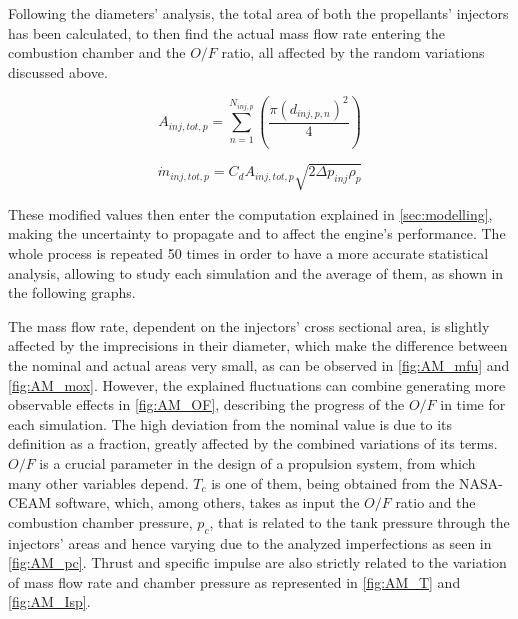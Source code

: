 Following the diameters' analysis, the total area of both the propellants' injectors has been calculated, to then find the actual mass flow rate entering the combustion chamber and the $O/F$ ratio, all affected by the random variations discussed above. 


\begin{equation}
	A_{inj,tot,p} = \sum_{n=1}^{N_{inj,p}} \left(\frac{\pi(d_{inj,p,n})^2}{4} \right)
    \label{eq:totalarea}
\end{equation}

\begin{equation}
    \dot m_{inj,tot,p} = C_{d}A_{inj,tot,p}\sqrt{2\Delta p_{inj}\rho_p}
    \label{eq:massflow}
\end{equation}

These modified values then enter the computation explained in \autoref{sec:modelling}, making the uncertainty to propagate and to affect the engine's performance. The whole process is repeated 50 times in order to have a more accurate statistical analysis, allowing to study each simulation and the average of them, as shown in the following graphs.




The mass flow rate, dependent on the injectors' cross sectional area, is slightly affected by the imprecisions in their diameter, which make the difference between the nominal and actual areas very small, as can be observed in \autoref{fig:AM_mfu} and \autoref{fig:AM_mox}. However, the explained fluctuations can combine generating more observable effects in \autoref{fig:AM_OF}, describing the progress of the $O/F$ in time for each simulation.
The high deviation from the nominal value is due to its definition as a fraction, greatly affected by the combined variations of its terms.
$O/F$ is a crucial parameter in the design of a propulsion system, from which many other variables depend. $T_c$ is one of them, being obtained from the NASA-CEAM software, which, among others, takes as input the $O/F$ ratio and the combustion chamber pressure, $p_c$, that is related to the tank pressure through the injectors' areas and hence varying due to the analyzed imperfections as seen in \autoref{fig:AM_pc}.
Thrust and specific impulse are also strictly related to the variation of mass flow rate and chamber pressure as represented in \autoref{fig:AM_T} and \autoref{fig:AM_Isp}.

